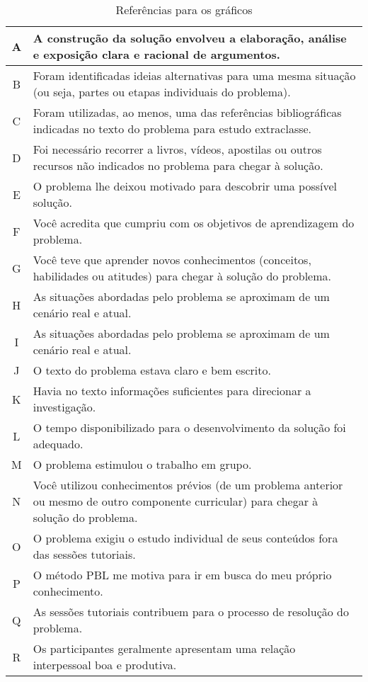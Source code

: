 \begin{table}[h]
\caption{Referências para os gráficos}
\begin{tabular}{c|p{14.7cm}}
\hline
A & A construção da solução envolveu a elaboração, análise e exposição clara e racional de argumentos.\\
\hline
B & Foram identificadas ideias alternativas para uma mesma situação (ou seja, partes ou etapas individuais do problema).\\
\hline
C & Foram utilizadas, ao menos, uma das referências bibliográficas indicadas no texto do problema para estudo extraclasse.\\
\hline
D & Foi necessário recorrer a livros, vídeos, apostilas ou outros recursos não indicados no problema para chegar à solução.\\
\hline
E & O problema lhe deixou motivado para descobrir uma possível solução.\\
\hline
F & Você acredita que cumpriu com os objetivos de aprendizagem do problema.\\
\hline
G & Você teve que aprender novos conhecimentos (conceitos, habilidades ou atitudes) para chegar à solução do problema.\\
\hline
H & As situações abordadas pelo problema se aproximam de um cenário real e atual.\\
\hline
I & As situações abordadas pelo problema se aproximam de um cenário real e atual.\\
\hline
J & O texto do problema estava claro e bem escrito.\\
\hline
K & Havia no texto informações suficientes para direcionar a investigação.\\
\hline
L & O tempo disponibilizado para o desenvolvimento da solução foi adequado.\\
\hline
M & O problema estimulou o trabalho em grupo.\\
\hline
N & Você utilizou conhecimentos prévios (de um problema anterior ou mesmo de outro componente curricular) para chegar à solução do problema.\\
\hline
O & O problema exigiu o estudo individual de seus conteúdos fora das sessões tutoriais.\\
\hline
P & O método PBL me motiva para ir em busca do meu próprio conhecimento.\\
\hline
Q & As sessões tutoriais contribuem para o processo de resolução do problema.\\
\hline
R & Os participantes geralmente apresentam uma relação interpessoal boa e produtiva.\\

\end{tabular}
\end{table}
